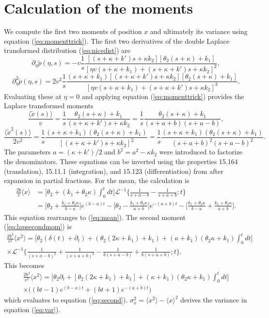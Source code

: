 \documentclass[draft,grl]{agujournal2018}
\newcommand\be{\begin{equation}}
\newcommand\ee{\end{equation}}
\newcommand\bra{\langle}
\newcommand\ket{\rangle}
\newcommand\tp{\tilde{p}}
\newcommand\El{\mathcal{L}}
\begin{document}
\section{Calculation of the moments}
\label{sec:appendixB}
We compute the first two moments of position $x$ and ultimately its variance using equation (\ref{eq:momenttrick}). The first two derivatives of the double Laplace transformed distribution (\ref{eq:nicedist}) are
\be \partial_\eta \tp(\eta,s) = -v \frac{1}{s}\frac{[(s+\kappa + k')s + \kappa k_2][\theta_2(s+\kappa) + k_1]}{[\eta v(s+\kappa +k_1) + (s+ \kappa + k')s+\kappa k_2]^2},\ee
\be \partial_\eta^2 \tp(\eta,s) = 2v^2 \frac{1}{s} \frac{(s+\kappa+k_1)[(s+\kappa + k')s+\kappa k_2][\theta_2(s+\kappa) + k_1]}{[\eta v(s+\kappa + k_1) + (s+\kappa + k')s+ \kappa k_2]^3}.\ee
Evaluating these at $\eta=0$ and applying equation (\ref{eq:momenttrick}) provides the Laplace transformed moments
\be  \frac{\bra\tilde{x}(s)\ket} {v} = \frac{1}{s}\frac{\theta_2(s+\kappa)+k_1}{(s+\kappa+k')s+\kappa k_2} = \frac{1}{s} \frac{\theta_2(s+\kappa)+k_1}{(s+a+b)(s+a-b)}\label{eq:lapmean},\ee
\be \frac{\bra \tilde{x}^2(s) \ket}{2v^2} = \frac{1}{s} \frac{(s+\kappa+k_1)(\theta_2(s+\kappa)+k_1)}{[(s+\kappa+k')s+\kappa k_2]^2}=  \frac{1}{s}\frac{(s+\kappa+k_1)(\theta_2(s+\kappa)+k_1)}{(s+a+b)^2(s+a-b)^2}.\label{eq:lapsecondmom}\ee
The parameters $a= (\kappa+k')/2$ and $b^2 = a^2 -\kappa k_2$ were introduced to factorize the denominators.
These equations can be inverted using the properties 15.164 (translation), 15.11.1 (integration), and 15.123 (differentiation) from  \citet{Arfken1985} after expansion in partial fractions.
For the mean, the calculation is
\begin{align}
\frac{2b}{v}\bra x \ket &= \big[\theta_2 + (k_1+\theta_2 \kappa)\int_0^t dt\big]\El^{-1}\Big\{ \frac{1}{s+a-b}-\frac{1}{s+a+b};t\Big\}\\
&= \Big[\theta_2 + \frac{k_1+\theta_2\kappa}{b-a}\Big]e^{(b-a)t} - \Big[\theta_2 - \frac{k_1+\theta_2\kappa}{a+b}\Big]e^{-(a+b)t} - \Big[\frac{k_1+\theta_2\kappa}{b-a} + \frac{k_1+\theta_2\kappa}{a+b}\Big].
\end{align}
This equation rearranges to (\ref{eq:mean}).
The second moment (\ref{eq:lapsecondmom}) is 
\begin{multline}
\frac{2b^2}{v^2}\bra x^2 \ket = \Big[\theta_2(\delta(t) + \partial_t) + (\theta_2(2\kappa + k_1)+k_1) + (\kappa+k_1)(\theta_2\kappa+k_1)\int_0^t dt \Big] \\
\times \El^{-1}\Big\{ \frac{1}{(s+a-b)^2} + \frac{1}{(s+a+b)^2}-\frac{1}{b(s+a-b)}+\frac{1}{b(s+a+b)};t\Big\}.
\end{multline}
This becomes 
\begin{multline}
\frac{2b^3}{v^2}\bra x^2 \ket = \Big[\theta_2\partial_t + [\theta_2(2\kappa+k_1)+k_1] + (\kappa+k_1)(\theta_2\kappa+k_1)\int_0^tdt\Big]\\
\times \Big((bt-1)e^{(b-a)t}+(bt+1)e^{-(a+b)t}\Big)
\end{multline}
which evaluates to equation (\ref{eq:second}).
$\sigma_x^2 = \bra x^2 \ket - \bra x \ket^2$ derives the variance in equation (\ref{eq:var}).
\end{document}
